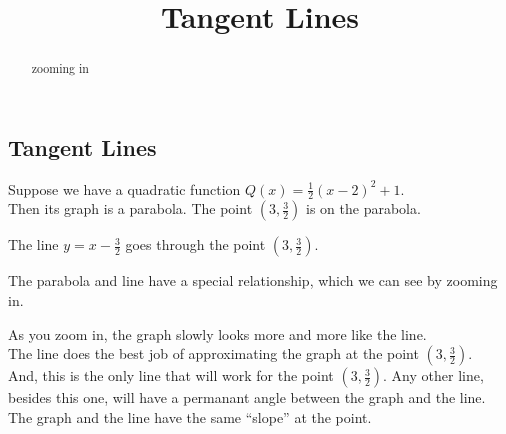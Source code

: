 \documentclass{ximera}
\title{Tangent Lines}
\begin{document}
\begin{abstract}
zooming in
\end{abstract}
\maketitle





\subsection*{Tangent Lines}



Suppose we have a quadratic function $Q(x) = \frac{1}{2} (x - 2)^2 + 1$. \\


Then its graph is a parabola. The point $\left( 3, \frac{3}{2} \right)$ is on the parabola.


The line $y=x-\frac{3}{2}$  goes through the point $\left( 3, \frac{3}{2} \right)$.

The parabola and line have a special relationship, which we can see by zooming in.



\begin{center}
\end{center}



\begin{center}
\end{center}



\begin{center}
\end{center}


\begin{center}
\end{center}



As you zoom in, the graph slowly looks more and more like the line. \\


The line does the best job of approximating the graph at the point $\left( 3, \frac{3}{2} \right)$. \\


And, this is the only line that will work for the point $\left( 3, \frac{3}{2} \right)$.  Any other line, besides this one, will have a permanant angle between the graph and the line.  The graph and the line have the same ``slope'' at the point. \\
\end{document}
